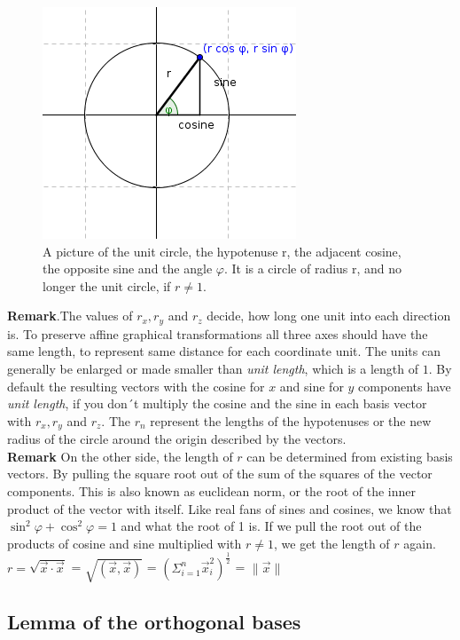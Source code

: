 \documentclass[a4paper]{article}
\begin{document}
\begin{figure}[ht]
\includegraphics[scale=2]{unitcircle.png}
\caption{A picture of the unit circle, the hypotenuse r, the adjacent cosine, the opposite sine and the angle $\varphi$. It is a circle of radius r, and no longer the unit circle, if $r \neq 1$.}
\end{figure}


\textbf{Remark}.The values of $r_x, r_y$ and $r_z$ decide, how long one unit into each
direction is. To preserve affine graphical transformations all three
axes should have the same length, to represent same distance for each coordinate unit. 
The units can generally be enlarged or made smaller than \emph{unit length}, which is a length of $1$. 
By default the resulting vectors with the cosine for $x$ and sine for $y$ components have \emph{unit length}, 
if you don´t multiply the cosine and the sine in each basis vector with $r_x, r_y$ and $r_z$. The $r_n$ represent the lengths of the hypotenuses or the new radius of the circle around the origin described by the vectors. \\

\textbf{Remark} On the other side, the length of $r$ can be determined from existing basis vectors.
By pulling the square root out of the sum of the squares of the vector components.
This is also known as euclidean norm, or the root of the inner product of the vector with itself.
Like real fans of sines and cosines, we know that $\sin^2 \varphi + \cos^2 \varphi = 1$ and what the root of 1 is.
If we pull the root out of the products of cosine and sine multiplied with $r \ne 1$, we get the length of $r$ again. 
$r = \sqrt{\vec{x}\cdot\vec{x}}$ = $\sqrt{(\vec{x},\vec{x})}$ = $\left(\Sigma_{i=1}^{n} \vec{x}_i^2\right)^{\frac{1}{2}}$ = $\|\vec{x}\|$\\

\subsection{Lemma of the orthogonal bases}\\
\end{document}
